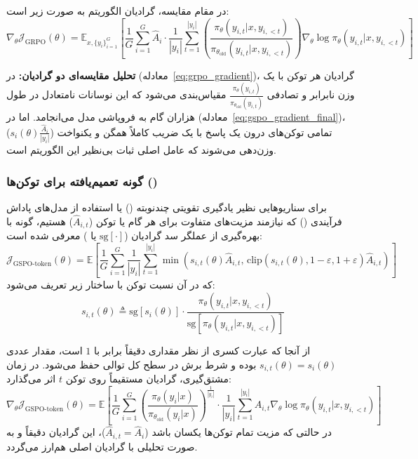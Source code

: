 در مقام مقایسه، گرادیان الگوریتم  به صورت زیر است:
\begin{equation}
    \label{eq:grpo_gradient}
    \nabla_\theta \mathcal{J}_{\text{GRPO}}(\theta) = \mathbb{E}_{x, \{y_i\}_{i=1}^G} \left[ \frac{1}{G} \sum_{i=1}^G \hat{A}_i \cdot \frac{1}{|y_i|} \sum_{t=1}^{|y_i|} \left( \frac{\pi_\theta(y_{i,t}|x, y_{i,<t})}{\pi_{\theta_{\text{old}}}(y_{i,t}|x, y_{i,<t})} \right) \nabla_\theta \log \pi_\theta(y_{i,t} | x, y_{i,<t}) \right]
\end{equation}

\textbf{تحلیل مقایسه‌ای دو گرادیان:}
در  (معادله~\eqref{eq:grpo_gradient})، گرادیان هر توکن با یک وزن نابرابر و تصادفی $\frac{\pi_\theta(y_{i,t})}{\pi_{\theta_{\text{old}}}(y_{i,t})}$ مقیاس‌بندی می‌شود که این نوسانات نامتعادل در طول هزاران گام به فروپاشی مدل می‌انجامد. اما در  (معادله~\eqref{eq:gspo_gradient_final})، تمامی توکن‌های درون یک پاسخ با یک ضریب کاملاً همگن و یکنواخت ($s_i(\theta) \frac{\hat{A}_i}{|y_i|}$) وزن‌دهی می‌شوند که عامل اصلی ثبات بی‌نظیر این الگوریتم است.

\subsubsection*{گونه تعمیم‌یافته برای توکن‌ها ()}

برای سناریوهایی نظیر یادگیری تقویتی چندنوبته () یا استفاده از مدل‌های پاداش فرآیندی () که نیازمند مزیت‌های متفاوت برای هر گام یا توکن ($\hat{A}_{i,t}$) هستیم، گونه  با بهره‌گیری از عملگر سد گرادیان ($\text{sg}[\cdot]$ یا ) معرفی شده است:
\begin{equation}
    \mathcal{J}_{\text{GSPO-token}}(\theta) = \mathbb{E} \left[ \frac{1}{G} \sum_{i=1}^G \frac{1}{|y_i|} \sum_{t=1}^{|y_i|} \min \left( s_{i,t}(\theta) \hat{A}_{i,t}, \, \text{clip}(s_{i,t}(\theta), 1-\varepsilon, 1+\varepsilon) \hat{A}_{i,t} \right) \right]
\end{equation}
که در آن نسبت توکن با ساختار زیر تعریف می‌شود:
\begin{equation}
    s_{i,t}(\theta) \triangleq \text{sg}[s_i(\theta)] \cdot \frac{\pi_\theta(y_{i,t} | x, y_{i,<t})}{\text{sg}\left[\pi_\theta(y_{i,t} | x, y_{i,<t})\right]}
\end{equation}

از آنجا که عبارت کسری از نظر مقداری دقیقاً برابر با $1$ است، مقدار عددی $s_{i,t}(\theta) = s_i(\theta)$ بوده و شرط برش در سطح کل توالی حفظ می‌شود. در زمان مشتق‌گیری، گرادیان مستقیماً روی توکن $t$ اثر می‌گذارد:
\begin{equation}
    \nabla_\theta \mathcal{J}_{\text{GSPO-token}}(\theta) = \mathbb{E} \left[ \frac{1}{G} \sum_{i=1}^G \left( \frac{\pi_\theta(y_i|x)}{\pi_{\theta_{\text{old}}}(y_i|x)} \right)^{\frac{1}{|y_i|}} \cdot \frac{1}{|y_i|} \sum_{t=1}^{|y_i|} \hat{A}_{i,t} \nabla_\theta \log \pi_\theta(y_{i,t} | x, y_{i,<t}) \right]
\end{equation}
در حالتی که مزیت تمام توکن‌ها یکسان باشد ($\hat{A}_{i,t} = \hat{A}_i$)، این گرادیان دقیقاً و به صورت تحلیلی با گرادیان  اصلی هم‌ارز می‌گردد.

